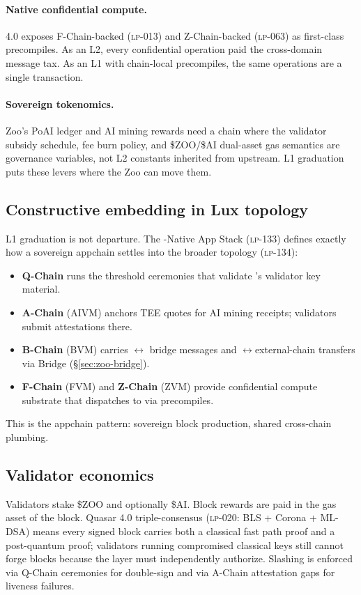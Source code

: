 \paragraph{Native confidential compute.} \Zoo{} 4.0 exposes
F-Chain-backed \FHE{} (\textsc{lp-013}) and Z-Chain-backed \ZKP{}
(\textsc{lp-063}) as first-class precompiles. As an L2, every confidential
operation paid the cross-domain message tax. As an L1 with chain-local
precompiles, the same operations are a single transaction.

\paragraph{Sovereign tokenomics.} Zoo's PoAI ledger and AI mining rewards
need a chain where the validator subsidy schedule, fee burn policy, and
\$ZOO/\$AI dual-asset gas semantics are governance variables, not L2
constants inherited from upstream. L1 graduation puts these levers where
the Zoo \DAO{} can move them.

\subsection{Constructive embedding in Lux topology}

L1 graduation is not departure. The \Quasar{}-Native App Stack
(\textsc{lp-133}) defines exactly how a sovereign appchain settles into the
broader \Lux{} topology (\textsc{lp-134}):

\begin{itemize}[leftmargin=1.2em]
  \item \textbf{Q-Chain} runs the \Corona{} threshold ceremonies that
        validate \Zoo{}'s validator key material.
  \item \textbf{A-Chain} (AIVM) anchors TEE quotes for AI mining receipts;
        \Zoo{} validators submit attestations there.
  \item \textbf{B-Chain} (BVM) carries \Zoo{}$\leftrightarrow$\Lux{} bridge
        messages and \Zoo{}$\leftrightarrow$external-chain transfers via
        \Zoo{} Bridge (\S\ref{sec:zoo-bridge}).
  \item \textbf{F-Chain} (FVM) and \textbf{Z-Chain} (ZVM) provide
        confidential compute substrate that \Zoo{} dispatches to via
        precompiles.
\end{itemize}

This is the appchain pattern: sovereign block production, shared cross-chain
plumbing.

\subsection{Validator economics}

Validators stake \$ZOO and optionally \$AI. Block rewards are paid in the
gas asset of the block. Quasar 4.0 triple-consensus
(\textsc{lp-020}: BLS + Corona + ML-DSA) means every signed block carries
both a classical fast path proof and a post-quantum proof; validators
running compromised classical keys still cannot forge blocks because the
\Corona{} layer must independently authorize. Slashing is enforced via
Q-Chain ceremonies for double-sign and via A-Chain attestation gaps for
liveness failures.
